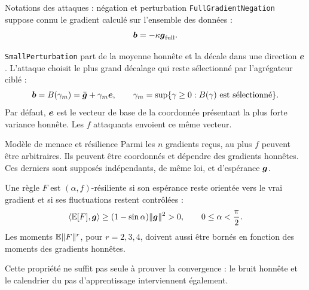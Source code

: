 \begin{frame}{Notations des attaques : négation et perturbation}
    \small
    \texttt{FullGradientNegation} suppose connu le gradient calculé sur
    l'ensemble des données :
    \[
        \boldsymbol{b}=-\kappa\boldsymbol{g}_{\mathrm{full}}.
    \]

    \medskip
    \texttt{SmallPerturbation} part de la moyenne honnête et la décale dans
    une direction $\boldsymbol{e}$. L'attaque choisit le plus grand décalage qui
    reste sélectionné par l'agrégateur ciblé :
    \[
        \boldsymbol{b}=B(\gamma_m)=\bar{\boldsymbol{g}}+\gamma_m\boldsymbol{e},
        \qquad
        \gamma_m=\sup\{\gamma\geq0:
        B(\gamma)\text{ est sélectionné}\}.
    \]
    Par défaut, $\boldsymbol{e}$ est le vecteur de base de la coordonnée présentant
    la plus forte variance honnête. Les $f$ attaquants envoient ce même vecteur.
\end{frame}

\begin{frame}{Modèle de menace et résilience}
    \small
    Parmi les $n$ gradients reçus, au plus $f$ peuvent être arbitraires.
    Ils peuvent être coordonnés et dépendre des gradients honnêtes.
    Ces derniers sont supposés indépendants, de même loi, et d'espérance
    $\boldsymbol{g}$.

    \medskip
    Une règle $F$ est $(\alpha,f)$-résiliente si son espérance reste orientée
    vers le vrai gradient et si ses fluctuations restent contrôlées :
    \[
        \langle\mathbb{E}[F],\boldsymbol{g}\rangle
        \geq (1-\sin\alpha)\lVert \boldsymbol{g} \rVert^2>0,
        \qquad 0\leq\alpha<\frac{\pi}{2}.
    \]
    Les moments $\mathbb{E}\lVert F \rVert^{r}$, pour $r=2,3,4$, doivent aussi être
    bornés en fonction des moments des gradients honnêtes.

    \medskip
    Cette propriété ne suffit pas seule à prouver la convergence : le bruit
    honnête et le calendrier du pas d'apprentissage interviennent également.
\end{frame}


